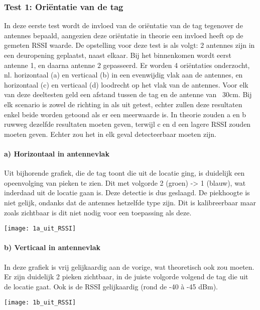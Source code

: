 \subsubsection{Test 1: Oriëntatie van de tag}
In deze eerste test wordt de invloed van de oriëntatie van de tag tegenover de antennes bepaald, aangezien deze oriëntatie in theorie een invloed heeft op de gemeten RSSI waarde. De opstelling voor deze test is als volgt: 2 antennes zijn in een deuropening geplaatst, naast elkaar. Bij het binnenkomen wordt eerst antenne 1, en daarna antenne 2 gepasseerd. Er worden 4 oriëntaties onderzocht, nl. horizontaal (a) en verticaal (b) in een evenwijdig vlak aan de antennes, en horizontaal (c) en verticaal (d) loodrecht op het vlak van de antennes. Voor elk van deze deeltesten geld een afstand tussen de tag en de antenne van ~30cm. Bij elk scenario is zowel de richting in als uit getest, echter zullen deze resultaten enkel beide worden getoond als er een meerwaarde is.
In theorie zouden a en b ruwweg dezelfde resultaten moeten geven, terwijl c en d een lagere RSSI zouden moeten geven. Echter zou het in elk geval detecteerbaar moeten zijn.

\paragraph{a) Horizontaal in antennevlak}
\begin{minipage}{0.55\textwidth}
Uit bijhorende grafiek, die de tag toont die uit de locatie ging, is duidelijk een opeenvolging van pieken te zien. Dit met volgorde 2 (groen) -> 1 (blauw), wat inderdaad uit de locatie gaan is. Deze detectie is dus geslaagd. De piekhoogte is niet gelijk, ondanks dat de antennes hetzelfde type zijn. Dit is kalibreerbaar maar zoals zichtbaar is dit niet nodig voor een toepassing als deze.
\end{minipage}
\hfill
\begin{minipage}{0.42\textwidth}
	\texttt{[image: 1a\_uit\_RSSI]}
	\label{fig:ond-rfid-static-1a-res}
\end{minipage}

\paragraph{b) Verticaal in antennevlak}
\begin{minipage}{0.55\textwidth}
In deze grafiek is vrij gelijkaardig aan de vorige, wat theoretisch ook zou moeten. Er zijn duidelijk 2 pieken zichtbaar, in de juiste volgorde volgend de tag die uit de locatie gaat. Ook is de RSSI gelijkaardig (rond de -40 à -45 dBm).
\end{minipage}
\hfill
\begin{minipage}{0.42\textwidth}
	\texttt{[image: 1b\_uit\_RSSI]}
	\label{fig:ond-rfid-static-1b-res}
\end{minipage}

